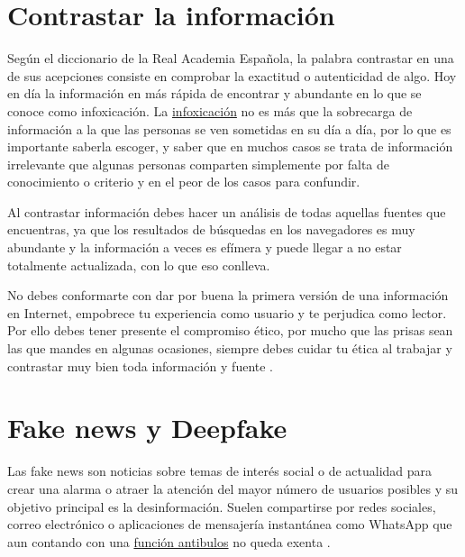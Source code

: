 \documentclass[
  spanish,
  a4paper,
  openany]{book}
\begin{document}
\hypertarget{contrastar-la-informaciuxf3n}{%
\section{Contrastar la información}\label{contrastar-la-informaciuxf3n}}

Según el diccionario de la Real Academia Española, la palabra contrastar en una de sus acepciones consiste en comprobar la exactitud o autenticidad de algo. Hoy en día la información en más rápida de encontrar y abundante en lo que se conoce como infoxicación. La \href{https://es.godaddy.com/blog/infoxicacion-causas-consecuencias/}{infoxicación} no es más que la sobrecarga de información a la que las personas se ven sometidas en su día a día, por lo que es importante saberla escoger, y saber que en muchos casos se trata de información irrelevante que algunas personas comparten simplemente por falta de conocimiento o criterio y en el peor de los casos para confundir.

Al contrastar información debes hacer un análisis de todas aquellas fuentes que encuentras, ya que los resultados de búsquedas en los navegadores es muy abundante y la información a veces es efímera y puede llegar a no estar totalmente actualizada, con lo que eso conlleva.

No debes conformarte con dar por buena la primera versión de una información en Internet, empobrece tu experiencia como usuario y te perjudica como lector. Por ello debes tener presente el compromiso ético, por mucho que las prisas sean las que mandes en algunas ocasiones, siempre debes cuidar tu ética al trabajar y contrastar muy bien toda información y fuente \citep{contrastar-informacion}.

\hypertarget{fake-news-y-deepfake}{%
\section{Fake news y Deepfake}\label{fake-news-y-deepfake}}

Las fake news son noticias sobre temas de interés social o de actualidad para crear una alarma o atraer la atención del mayor número de usuarios posibles y su objetivo principal es la desinformación. Suelen compartirse por redes sociales, correo electrónico o aplicaciones de mensajería instantánea como WhatsApp que aun contando con una \href{https://www.osi.es/es/actualidad/blog/2020/04/27/whatsapp-y-su-funcion-antibulos-descubrela}{función antibulos} no queda exenta \citep{OSI-bulos-buenas-practicas}.
\end{document}
